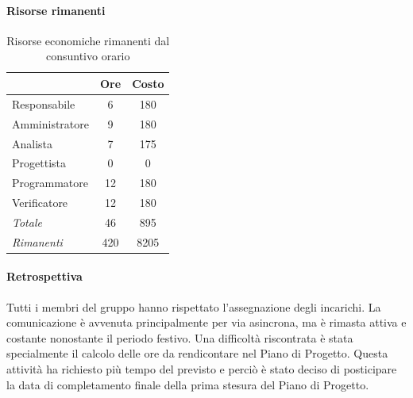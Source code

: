 \documentclass[a4paper,12pt]{article}
\begin{document}
            \paragraph{Risorse rimanenti}
                \begin{table}[H]
                \centering
                \begin{tabular}{|l|c|c|}
                \hline
                    \rowcolor{lightgray}{\textbf{Ruolo}} & {\textbf{Ore}} & {\textbf{Costo}}\\
                \hline
                    Responsabile & 6 & 180\\
                \hline
                    Amministratore & 9 & 180\\
                \hline
                    Analista & 7 & 175\\
                \hline
                    Progettista & 0 & 0\\
                \hline
                    Programmatore & 12 & 180\\
                \hline
                    Verificatore & 12 & 180\\
                \hline
                    \rowcolor{lightgray}\textit{Totale} & 46 & 895\\
                \hline
                    \rowcolor{lightgray}\textit{Rimanenti} & 420 & 8205\\
                \hline
                \end{tabular}
                \caption{Risorse economiche rimanenti dal consuntivo orario}
                \end{table}
                
            \paragraph{Retrospettiva}
            Tutti i membri del gruppo hanno rispettato l'assegnazione degli incarichi. La comunicazione è avvenuta principalmente per via asincrona, ma è rimasta attiva e costante nonostante il periodo festivo. Una difficoltà riscontrata è stata specialmente il calcolo delle ore da rendicontare nel Piano di Progetto. Questa attività ha richiesto più tempo del previsto e perciò è stato deciso di posticipare la data di completamento finale della prima stesura del Piano di Progetto.
    
\end{document}
